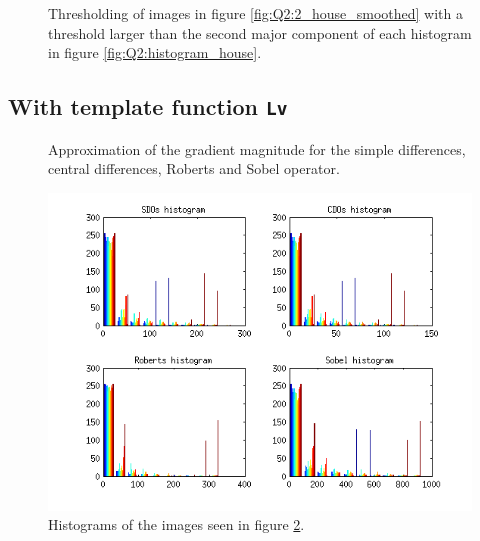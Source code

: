 \begin{figure}[H]
	\centering
	\scalebox{0.9}{}
	\caption{Thresholding of images in figure \ref{fig:Q2:2_house_smoothed} with a threshold larger than the second major component of 
	each histogram in figure \ref{fig:Q2:histogram_house}.}
	\label{fig:Q2:threshold_house_2}
\end{figure}












\subsection{With template function \texttt{Lv}}

\begin{figure}[H]
	\centering
	\scalebox{0.7}{}
	\caption{Approximation of the gradient magnitude for the simple differences, central differences, Roberts and Sobel operator.}
	\label{fig:Q2:2_tools_with_lv}
\end{figure}

\begin{figure}[H]
	\centering
	\includegraphics[scale=0.8]{./images/Q2/with_lv/tools/histogram_1.png}
	\caption{Histograms of the images seen in figure \ref{fig:Q2:2_tools_with_lv}.}
	\label{fig:Q2:histogram_tools_with_lv}
\end{figure}


